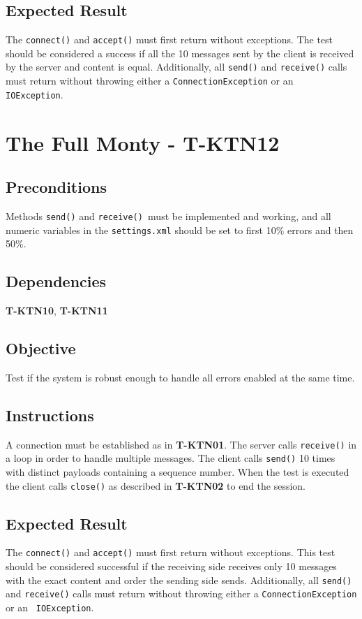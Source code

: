 \documentclass{article}
\begin{document}
\subsection{Expected Result}

The \texttt{connect()} and \texttt{accept()} must first return without
exceptions. The test should be considered a success if all the 10 messages
sent by the client is received by the server and content is equal.
Additionally, all \texttt{send()} and \texttt{receive()} calls must return
without throwing either a \texttt{ConnectionException} or an \texttt{%
IOException}.

\section{The Full Monty - T-KTN12}

\subsection{Preconditions}

Methods \texttt{send()} and \texttt{receive() }must be implemented and
working, and all numeric variables in the \texttt{settings.xml} should be
set to first 10\% errors and then 50\%.

\subsection{Dependencies}

\textbf{T-KTN10}, \textbf{T-KTN11}

\subsection{Objective}

Test if the system is robust enough to handle all errors enabled at the same
time.

\subsection{Instructions}

A connection must be established as in \textbf{T-KTN01}. The server calls 
\texttt{receive()} in a loop in order to handle multiple messages. The
client calls \texttt{send()} 10 times with distinct payloads containing a
sequence number. When the test is executed the client calls \texttt{close()}
as described in \textbf{T-KTN02} to end the session.

\subsection{Expected Result}

The \texttt{connect()} and \texttt{accept()} must first return without
exceptions. This test should be considered successful if the receiving side
receives only 10 messages with the exact content and order the sending side
sends. Additionally, all \texttt{send()} and \texttt{receive()} calls must
return without throwing either a \texttt{ConnectionException} or an \texttt{%
IOException}.
\end{document}
